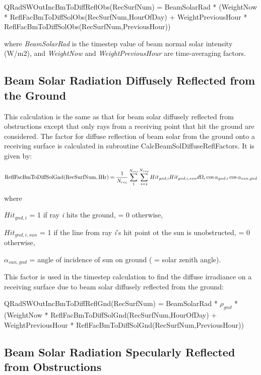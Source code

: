 QRadSWOutIncBmToDiffReflObs(RecSurfNum) = BeamSolarRad * (WeightNow * ReflFacBmToDiffSolObs(RecSurfNum,HourOfDay) + WeightPreviousHour * ReflFacBmToDiffSolObs(RecSurfNum,PreviousHour))

where \emph{BeamSolarRad} is the timestep value of beam normal solar intensity (W/m2), and \emph{WeightNow} and \emph{WeightPreviousHour} are time-averaging factors.

\subsection{Beam Solar Radiation Diffusely Reflected from the Ground}\label{beam-solar-radiation-diffusely-reflected-from-the-ground}

This calculation is the same as that for beam solar diffusely reflected from obstructions except that only rays from a receiving point that hit the ground are considered. The factor for diffuse reflection of beam solar from the ground onto a receiving surface is calculated in subroutine CalcBeamSolDiffuseReflFactors. It is given by:

{\scriptsize
\begin{equation}
{\rm{ReflFacBmToDiffSolGnd(RecSurfNum,IHr)}} = \frac{1}{{{N_{rec}}}}\sum\limits_1^{{N_{rec}}} {\sum\limits_{i = 1}^{{N_{ray}}} {Hi{t_{gnd,i}}Hi{t_{gnd,i,sun}}d{\Omega_i}\cos {\alpha_{gnd,i}}\cos {\alpha_{sun,gnd}}} }
\end{equation}}

where

\(Hi{t_{gnd,i}}\) = 1 if ray \emph{i} hits the ground, = 0 otherwise,

\(Hi{t_{gnd,i,sun}}\) = 1 if the line from ray \emph{i}'s hit point ot the sun is unobstructed, = 0 otherwise,

\({\alpha_{sun,gnd}}\) = angle of incidence of sun on ground ( = solar zenith angle).

This factor is used in the timestep calculation to find the diffuse irradiance on a receiving surface due to beam solar diffusely reflected from the ground:

QRadSWOutIncBmToDiffReflGnd(RecSurfNum) = BeamSolarRad * \({\rho_{gnd}}\) * (WeightNow * ReflFacBmToDiffSolGnd(RecSurfNum,HourOfDay) + WeightPreviousHour * ReflFacBmToDiffSolGnd(RecSurfNum,PreviousHour))

\subsection{Beam Solar Radiation Specularly Reflected from Obstructions}\label{beam-solar-radiation-specularly-reflected-from-obstructions}

